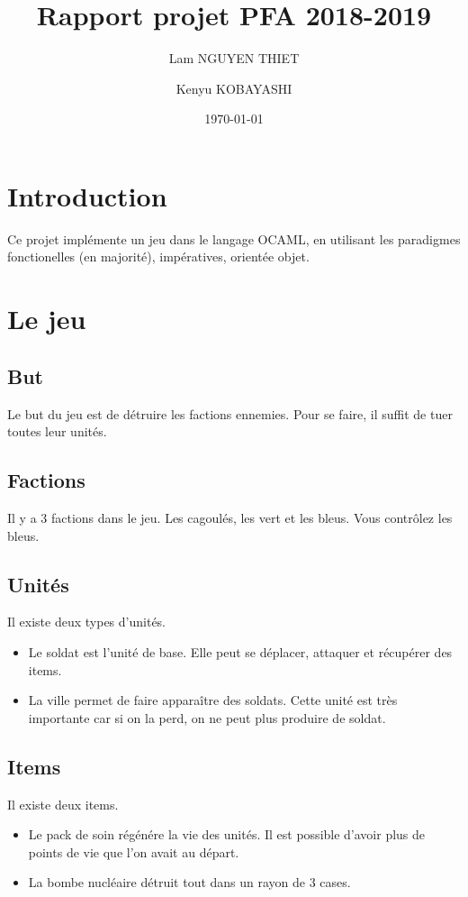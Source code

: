 \documentclass{article}
\title{Rapport projet PFA 2018-2019}
\date{\today}
\author{Lam NGUYEN THIET
\and Kenyu KOBAYASHI}
\begin{document}
\maketitle
\tableofcontents
\newpage
\section{Introduction}
Ce projet implémente un jeu dans le langage OCAML, en utilisant les paradigmes fonctionelles (en majorité), impératives, orientée objet.

\section{Le jeu}
\subsection{But}
Le but du jeu est de détruire les factions ennemies. Pour se faire, il suffit de tuer toutes leur unités.

\subsection{Factions}
Il y a 3 factions dans le jeu. Les cagoulés, les vert et les bleus. Vous contrôlez les bleus.

\subsection{Unités}
Il existe deux types d'unités.

\begin{itemize}
    \item Le soldat est l'unité de base. Elle peut se déplacer, attaquer et récupérer des items.
    \item La ville permet de faire apparaître des soldats. Cette unité est très importante car si on la perd, on ne peut plus produire de soldat.
\end{itemize}

\subsection{Items}
Il existe deux items.

\begin{itemize}
    \item Le pack de soin régénére la vie des unités. Il est possible d'avoir plus de points de vie que l'on avait au départ.
    \item La bombe nucléaire détruit tout dans un rayon de 3 cases.
\end{itemize}
\end{document}
